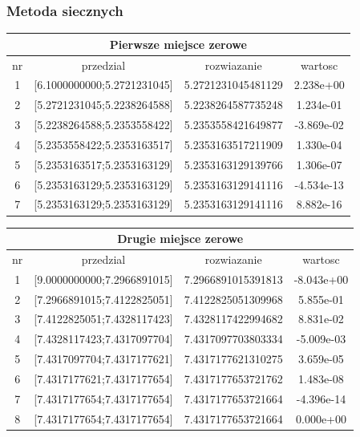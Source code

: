 \documentclass[polish, 11pt, oneside]{article}   	%
\begin{document}
\subsubsection{Metoda siecznych}

\begin{center}
\begin{tabular}{ |c|c|c|c| } 
\hline
\multicolumn{4}{|c|}{Pierwsze miejsce zerowe} \\
 \hline
 nr & przedzial & rozwiazanie & wartosc \\
 \hline
  1 & [6.1000000000;5.2721231045] & 5.2721231045481129 &    2.238e+00 \\ 
  2 & [5.2721231045;5.2238264588] & 5.2238264587735248 &    1.234e-01 \\ 
  3 & [5.2238264588;5.2353558422] & 5.2353558421649877 &   -3.869e-02 \\ 
  4 & [5.2353558422;5.2353163517] & 5.2353163517211909 &    1.330e-04 \\ 
  5 & [5.2353163517;5.2353163129] & 5.2353163129139766 &    1.306e-07 \\ 
  6 & [5.2353163129;5.2353163129] & 5.2353163129141116 &   -4.534e-13 \\ 
  7 & [5.2353163129;5.2353163129] & 5.2353163129141116 &    8.882e-16 \\ 
 \hline
\end{tabular}
\end{center}

\begin{center}
\begin{tabular}{ |c|c|c|c| } 
\hline
\multicolumn{4}{|c|}{Drugie miejsce zerowe} \\
 \hline
 nr & przedzial & rozwiazanie & wartosc \\
 \hline
1 & [9.0000000000;7.2966891015] & 7.2966891015391813 &   -8.043e+00 \\ 
  2 & [7.2966891015;7.4122825051] & 7.4122825051309968 &    5.855e-01 \\ 
  3 & [7.4122825051;7.4328117423] & 7.4328117422994682 &    8.831e-02 \\ 
  4 & [7.4328117423;7.4317097704] & 7.4317097703803334 &   -5.009e-03 \\ 
  5 & [7.4317097704;7.4317177621] & 7.4317177621310275 &    3.659e-05 \\ 
  6 & [7.4317177621;7.4317177654] & 7.4317177653721762 &    1.483e-08 \\ 
  7 & [7.4317177654;7.4317177654] & 7.4317177653721664 &   -4.396e-14 \\ 
  8 & [7.4317177654;7.4317177654] & 7.4317177653721664 &    0.000e+00 \\ 
 \hline
\end{tabular}
\end{center}
\end{document}
